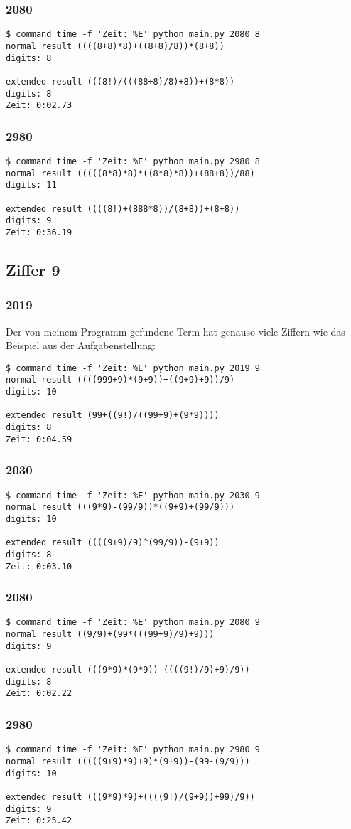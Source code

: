 \subsubsection{2080}
\begin{lstlisting}
$ command time -f 'Zeit: %E' python main.py 2080 8
normal result ((((8+8)*8)+((8+8)/8))*(8+8))
digits: 8

extended result (((8!)/(((88+8)/8)+8))+(8*8))
digits: 8
Zeit: 0:02.73
\end{lstlisting}
\subsubsection{2980}
\begin{lstlisting}
$ command time -f 'Zeit: %E' python main.py 2980 8
normal result (((((8*8)*8)*((8*8)*8))+(88+8))/88)
digits: 11

extended result ((((8!)+(888*8))/(8+8))+(8+8))
digits: 9
Zeit: 0:36.19
\end{lstlisting}
\subsection{Ziffer 9}
\subsubsection{2019}
Der von meinem Programm gefundene Term hat genauso viele Ziffern wie das Beispiel aus der Aufgabenstellung:
\begin{lstlisting}
$ command time -f 'Zeit: %E' python main.py 2019 9
normal result ((((999+9)*(9+9))+((9+9)+9))/9)
digits: 10

extended result (99+((9!)/((99+9)+(9*9))))
digits: 8
Zeit: 0:04.59
\end{lstlisting}
\subsubsection{2030}
\begin{lstlisting}
$ command time -f 'Zeit: %E' python main.py 2030 9
normal result (((9*9)-(99/9))*((9+9)+(99/9)))
digits: 10

extended result ((((9+9)/9)^(99/9))-(9+9))
digits: 8
Zeit: 0:03.10
\end{lstlisting}
\subsubsection{2080}
\begin{lstlisting}
$ command time -f 'Zeit: %E' python main.py 2080 9
normal result ((9/9)+(99*(((99+9)/9)+9)))
digits: 9

extended result (((9*9)*(9*9))-((((9!)/9)+9)/9))
digits: 8
Zeit: 0:02.22
\end{lstlisting}
\subsubsection{2980}
\begin{lstlisting}
$ command time -f 'Zeit: %E' python main.py 2980 9
normal result (((((9+9)*9)+9)*(9+9))-(99-(9/9)))
digits: 10

extended result (((9*9)*9)+((((9!)/(9+9))+99)/9))
digits: 9
Zeit: 0:25.42
\end{lstlisting}

